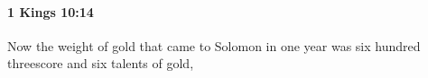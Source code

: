 
		\paragraph{1 Kings 10:14} %
			\label{1KINGS-10-14}

			Now the weight of gold that came to Solomon in one year was six hundred threescore and six talents of gold,


